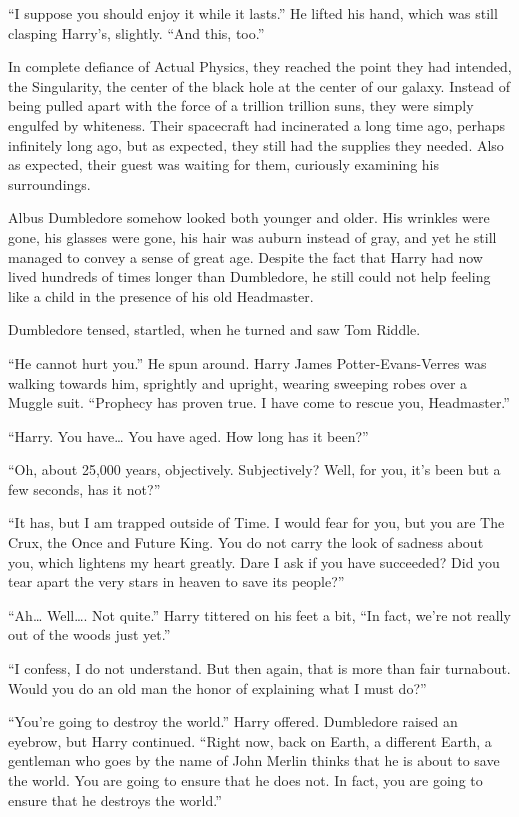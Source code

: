 “I suppose you should enjoy it while it lasts.” He lifted his hand, which was still clasping Harry’s, slightly. “And this, too.”

In complete defiance of Actual Physics, they reached the point they had intended, the Singularity, the center of the black hole at the center of our galaxy. Instead of being pulled apart with the force of a trillion trillion suns, they were simply engulfed by whiteness. Their spacecraft had incinerated a long time ago, perhaps infinitely long ago, but as expected, they still had the supplies they needed. Also as expected, their guest was waiting for them, curiously examining his surroundings.

Albus Dumbledore somehow looked both younger and older. His wrinkles were gone, his glasses were gone, his hair was auburn instead of gray, and yet he still managed to convey a sense of great age. Despite the fact that Harry had now lived hundreds of times longer than Dumbledore, he still could not help feeling like a child in the presence of his old Headmaster.

Dumbledore tensed, startled, when he turned and saw Tom Riddle.

“He cannot hurt you.” He spun around. Harry James Potter-Evans-Verres was walking towards him, sprightly and upright, wearing sweeping robes over a Muggle suit.  “Prophecy has proven true. I have come to rescue you, Headmaster.”

“Harry. You have… You have aged. How long has it been?”

“Oh, about 25,000 years, objectively. Subjectively? Well, for you, it’s been but a few seconds, has it not?”

“It has, but I am trapped outside of Time. I would fear for you, but you are The Crux, the Once and Future King. You do not carry the look of sadness about you, which lightens my heart greatly. Dare I ask if you have succeeded? Did you tear apart the very stars in heaven to save its people?”

“Ah… Well…. Not quite.” Harry tittered on his feet a bit, “In fact, we’re not really out of the woods just yet.”

“I confess, I do not understand. But then again, that is more than fair turnabout. Would you do an old man the honor of explaining what I must do?”

“You’re going to destroy the world.” Harry offered. Dumbledore raised an eyebrow, but Harry continued. “Right now, back on Earth, a different Earth, a gentleman who goes by the name of John Merlin thinks that he is about to save the world. You are going to ensure that he does not. In fact, you are going to ensure that he destroys the world.”

